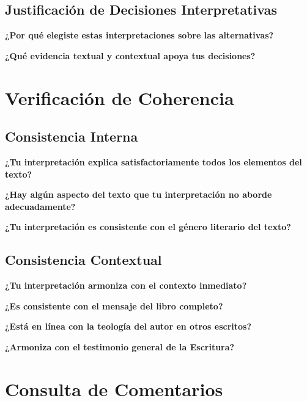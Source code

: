 \documentclass[11pt,a4paper]{article}
\begin{document}
\subsection{Justificación de Decisiones Interpretativas}

\textbf{¿Por qué elegiste estas interpretaciones sobre las alternativas?}
\vspace{3cm}

\textbf{¿Qué evidencia textual y contextual apoya tus decisiones?}
\vspace{3cm}

\section{Verificación de Coherencia}

\subsection{Consistencia Interna}

\textbf{¿Tu interpretación explica satisfactoriamente todos los elementos del texto?}
\vspace{2cm}

\textbf{¿Hay algún aspecto del texto que tu interpretación no aborde adecuadamente?}
\vspace{2cm}

\textbf{¿Tu interpretación es consistente con el género literario del texto?}
\vspace{2cm}

\subsection{Consistencia Contextual}

\textbf{¿Tu interpretación armoniza con el contexto inmediato?}
\vspace{2cm}

\textbf{¿Es consistente con el mensaje del libro completo?}
\vspace{2cm}

\textbf{¿Está en línea con la teología del autor en otros escritos?}
\vspace{2cm}

\textbf{¿Armoniza con el testimonio general de la Escritura?}
\vspace{2cm}

\newpage

\section{Consulta de Comentarios}
\end{document}
